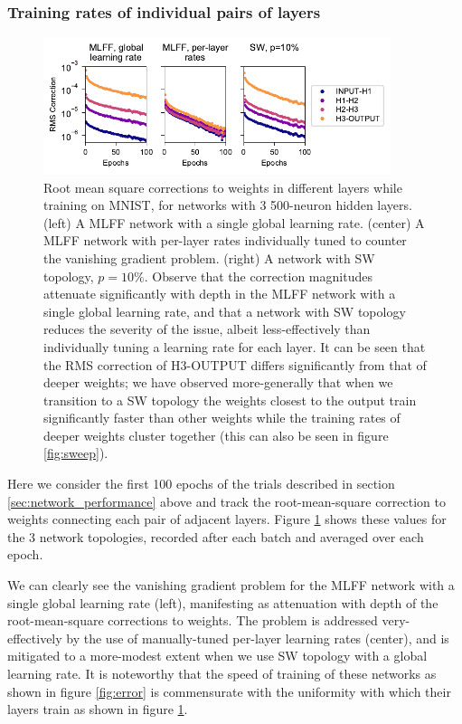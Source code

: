 \documentclass[utf8]{frontiersSCNS}
\begin{document}
\subsubsection{Training rates of individual pairs of layers}\label{sec:rates}

\label{sec:mnist_perlayer}
\begin{figure}
	\centering
	\includegraphics[width=4in]{figures/mnist_3layer_rates.pdf}
	\caption{Root mean square corrections to weights in different layers while training on MNIST, for networks with 3 500-neuron hidden layers. (left) A MLFF network with a single global learning rate. (center) A MLFF network with per-layer rates individually tuned to counter the vanishing gradient problem. (right) A network with SW topology, $p=10\%$. Observe that the correction magnitudes attenuate significantly with depth in the MLFF network with a single global learning rate, and that a network with SW topology reduces the severity of the issue, albeit less-effectively than individually tuning a learning rate for each layer. It can be seen that the RMS correction of H3-OUTPUT differs significantly from that of deeper weights; we have observed more-generally that when we transition to a SW topology the weights closest to the output train significantly faster than other weights while the training rates of deeper weights cluster together (this can also be seen in figure \ref{fig:sweep}).}
	\label{fig:rates}
\end{figure}

Here we consider the first 100 epochs of the trials described in section \ref{sec:network_performance} above and track the root-mean-square correction to weights connecting each pair of adjacent layers. Figure \ref{fig:rates} shows these values for the 3 network topologies, recorded after each batch and averaged over each epoch.

We can clearly see the vanishing gradient problem for the MLFF network with a single global learning rate (left), manifesting as attenuation with depth of the root-mean-square corrections to weights. The problem is addressed very-effectively by the use of manually-tuned per-layer learning rates (center), and is mitigated to a more-modest extent when we use SW topology with a global learning rate. It is noteworthy that the speed of training of these networks as shown in figure \ref{fig:error} is commensurate with the uniformity with which their layers train as shown in figure \ref{fig:rates}.
\end{document}
